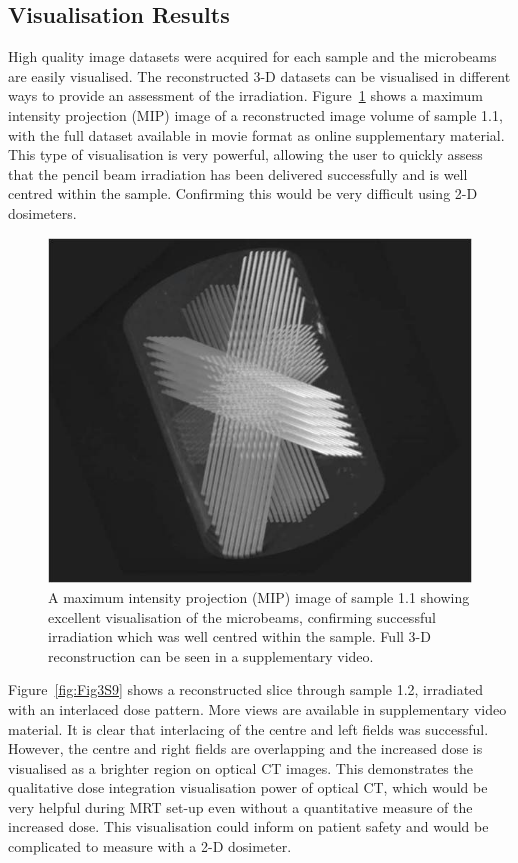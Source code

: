 	
	
	
	\subsection{Visualisation Results}
	High quality image datasets were acquired for each sample and the microbeams are easily visualised. The reconstructed 3-D datasets can be visualised in different ways to provide an assessment of the irradiation. Figure~\ref{fig:Fig2MIP} shows a maximum intensity projection (MIP) image of a reconstructed image volume of sample 1.1, with the full dataset available in movie format as online supplementary material. This type of visualisation is very powerful, allowing the user to quickly assess  that the pencil beam irradiation has been delivered successfully and is well centred within the sample. Confirming this would be very difficult using 2-D dosimeters. 
	
	\begin{figure}
		\centering
		\includegraphics[width=0.7\linewidth]{mrt_img/mrt_Fig2}
		\caption{A maximum intensity projection (MIP) image of sample 1.1 showing excellent visualisation of the microbeams, confirming successful irradiation which was well centred within the sample. Full 3-D reconstruction can be seen in a supplementary video.}
		\label{fig:Fig2MIP}
	\end{figure}
	
	
	Figure~\ref{fig:Fig3S9} shows a reconstructed slice through sample 1.2, irradiated with an interlaced dose pattern. More views are available in supplementary video material. It is clear that interlacing of the centre and left fields was successful. However, the centre and right fields are overlapping and the increased dose is visualised as a brighter region on optical CT images. This demonstrates the qualitative dose integration visualisation power of optical CT, which would be very helpful during MRT set-up even without a quantitative measure of the increased dose. This visualisation could inform on patient safety and would be complicated to measure with a 2-D dosimeter. 
	
